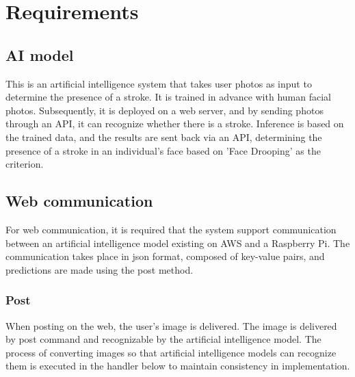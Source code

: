 \section{Requirements}
\subsection{AI model}
This is an artificial intelligence system that takes user photos as input to determine the presence of a stroke. It is trained in advance with human facial photos. Subsequently, it is deployed on a web server, and by sending photos through an API, it can recognize whether there is a stroke. Inference is based on the trained data, and the results are sent back via an API, determining the presence of a stroke in an individual's face based on 'Face Drooping' as the criterion.\\

\subsection{Web communication}
For web communication, it is required that the system support communication between an artificial intelligence model existing on AWS and a Raspberry Pi. The communication takes place in json format, composed of key-value pairs, and predictions are made using the post method.\\
\subsubsection{Post}
When posting on the web, the user's image is delivered. The image is delivered by post command and recognizable by the artificial intelligence model. The process of converting images so that artificial intelligence models can recognize them is executed in the handler below to maintain consistency in implementation.\\
